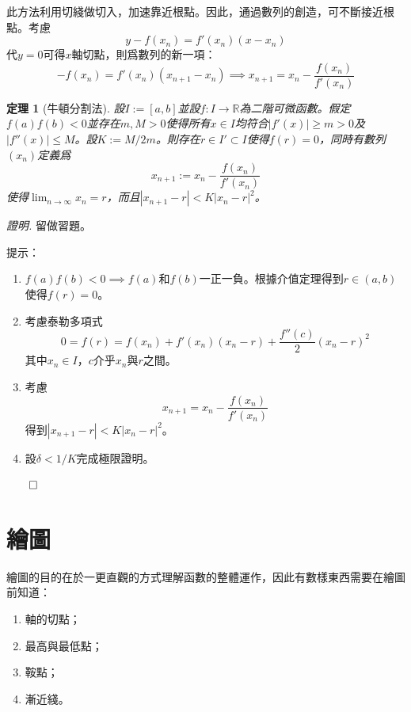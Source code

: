 \documentclass[12pt]{article}
\newtheorem*{theorem}{定理}
\renewenvironment*{proof}{\textit{證明.}}{\hfill$\qed$}
\begin{document}
    此方法利用切綫做切入，加速靠近根點。因此，通過數列的創造，可不斷接近根點。考慮$$y-f(x_n)=f'(x_n)(x-x_n)$$代$y=0$可得$x$軸切點，則爲數列的新一項：$$-f(x_n)=f'(x_n)(x_{n+1}-x_n) \implies x_{n+1}=x_n-\frac{f(x_n)}{f'(x_n)}$$

    \begin{theorem}[牛頓分割法]
        設$I:=[a,b]$並設$f:I\to\mathbb{R}$為二階可微函數。假定$f(a)f(b)<0$並存在$m,M>0$使得所有$x\in I$均符合$|f'(x)|\geq m>0$及$|f''(x)|\leq M$。設$K:=M/2m$。則存在$r\in I'\subset I$使得$f(r)=0$，同時有數列$(x_n)$定義爲$$x_{n+1}:=x_n-\frac{f(x_n)}{f'(x_n)}$$使得$\displaystyle\lim_{n\to \infty}x_n=r$，而且$|x_{n+1}-r|<K|x_n-r|^2$。
    \end{theorem}

    \begin{proof}
        留做習題。

        提示：\begin{enumerate}
            \item $f(a)f(b)<0\implies f(a)$和$f(b)$一正一負。根據介值定理得到$r\in(a,b)$使得$f(r)=0$。
            \item 考慮泰勒多項式$$0=f(r)=f(x_n)+f'(x_n)(x_n-r)+\frac{f''(c)}{2}(x_n-r)^2$$其中$x_n\in I$，$c$介乎$x_n$與$r$之間。
            \item 考慮$$x_{n+1}=x_n-\frac{f(x_n)}{f'(x_n)}$$得到$|x_{n+1}-r|<K|x_n-r|^2$。
            \item 設$\delta<1/K$完成極限證明。
        \end{enumerate}
    \end{proof}

    \newpage

    \section*{繪圖}

    繪圖的目的在於一更直觀的方式理解函數的整體運作，因此有數樣東西需要在繪圖前知道：\begin{enumerate}
        \item 軸的切點；
        \item 最高與最低點；
        \item 鞍點；
        \item 漸近綫。
    \end{enumerate}
\end{document}
